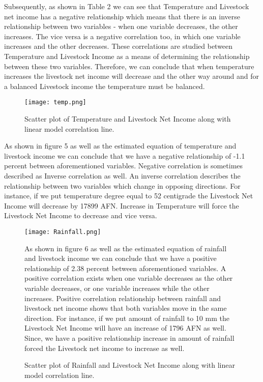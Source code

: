 \documentclass[12pt, a4]{article}
\begin{document}
\vspace{0.5\baselineskip}

Subsequently, as shown in Table 2 we can see that Temperature and Livestock net income has a negative relationship which means that there is an inverse relationship between two variables - when one variable decreases, the other increases. The vice versa is a negative correlation too, in which one variable increases and the other decreases. These correlations are studied between Temperature and Livestock Income as a means of determining the relationship between these two variables. Therefore, we can conclude that when temperature increases the livestock net income will decrease and the other way around and for a balanced Livestock income the temperature must be balanced.

\begin{figure}[h]
\centering
  \texttt{[image: temp.png]}
  \caption{Scatter plot of Temperature and Livestock Net Income along with linear model correlation line.}
  \label{fig:boat1}
  \end{figure}
  
  As shown in figure 5 as well as the estimated equation of temperature and livestock income we can conclude that we have a negative relationship of -1.1 percent between aforementioned variables. Negative correlation is sometimes described as Inverse correlation as well. An inverse correlation describes the relationship between two variables which change in opposing directions. For instance, if we put temperature degree equal to 52 centigrade the Livestock Net Income will decrease by 17899 AFN. Increase in Temperature will force the Livestock Net Income to decrease and vice versa.

\begin{figure}[h]
\begin{center}
  \texttt{[image: Rainfall.png]}
  \caption{Scatter plot of Rainfall and Livestock Net Income along with linear model correlation line.}
  \label{fig:boat1}
\end{center}  

\vspace{0.5\baselineskip}  
  
  As shown in figure 6 as well as the estimated equation of rainfall and livestock income we can conclude that we have a positive relationship of 2.38 percent between aforementioned variables. A positive correlation exists when one variable decreases as the other variable decreases, or one variable increases while the other increases. Positive correlation relationship between rainfall and livestock net income shows that both variables move in the same direction. For instance, if we put amount of rainfall to 10 mm   the Livestock Net Income will have an increase of 1796 AFN as well. Since, we have a positive relationship increase in amount of rainfall forced the Livestock net income to increase as well.
\end{figure}
\end{document}
